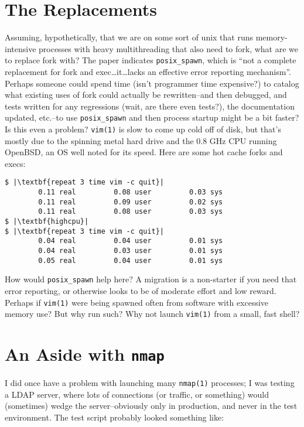 \documentclass[10pt,a4paper]{article}
\begin{document}
\section*{The Replacements}

Assuming, hypothetically, that we are on some sort of unix that runs
memory-intensive processes with heavy multithreading that also need to
fork, what are we to replace fork with? The paper indicates
\texttt{posix\_spawn}, which is ``not a complete replacement for fork
and exec\ldots it\ldots lacks an effective error reporting
mechanism''\citep[p.5]{Hotos2019}. Perhaps someone could spend time
(isn't programmer time expensive?) to catalog what existing uses of fork
could actually be rewritten--and then debugged, and tests written for
any regressions (wait, are there even tests?), the documentation
updated, etc.--to use \texttt{posix\_spawn} and then process startup
might be a bit faster? Is this even a problem? \texttt{vim(1)} is slow
to come up cold off of disk, but that's mostly due to the spinning metal
hard drive and the 0.8 GHz CPU running OpenBSD, an OS well noted
for its speed. Here are some hot cache forks and execs:

\begin{lstlisting}
$ |\textbf{repeat 3 time vim -c quit}|
        0.11 real         0.08 user         0.03 sys
        0.11 real         0.09 user         0.02 sys
        0.11 real         0.08 user         0.03 sys
$ |\textbf{highcpu}|
$ |\textbf{repeat 3 time vim -c quit}|
        0.04 real         0.04 user         0.01 sys
        0.04 real         0.03 user         0.01 sys
        0.05 real         0.04 user         0.01 sys
\end{lstlisting}

How would \texttt{posix\_spawn} help here? A migration is a non-starter
if you need that error reporting, or otherwise looks to be of moderate
effort and low reward. Perhaps if \texttt{vim(1)} were being spawned
often from software with excessive memory use? But why run such? Why not
launch \texttt{vim(1)} from a small, fast shell?

\section*{An Aside with \texttt{nmap}}

I did once have a problem with launching many \texttt{nmap(1)}
processes; I was testing a LDAP server, where lots of connections (or
traffic, or something) would (sometimes) wedge the server--obviously
only in production, and never in the test environment. The test script
probably looked something like:
\end{document}
